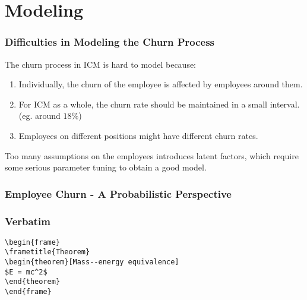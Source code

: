 \documentclass{beamer}
\begin{document}
\section{Modeling}

\begin{frame}
\frametitle{Difficulties in Modeling the Churn Process}
The churn process in ICM is hard to model because:
\begin{enumerate}
\item Individually, the churn of the employee is affected by employees around them.
\item For ICM as a whole, the churn rate should be maintained in a small interval. (eg. around $18\%$)
\item Employees on different positions might have different churn rates.

\end{enumerate}

Too many assumptions on the employees introduces latent factors, which require some serious parameter tuning to obtain a good model.


\end{frame}


\begin{frame}
\frametitle{Employee Churn - A Probabilistic Perspective}


\end{frame}


\begin{frame}[fragile] %
\frametitle{Verbatim}
\begin{example}
\begin{verbatim}
\begin{frame}
\frametitle{Theorem}
\begin{theorem}[Mass--energy equivalence]
$E = mc^2$
\end{theorem}
\end{frame}\end{verbatim}
\end{example}
\end{frame}

\end{document}
